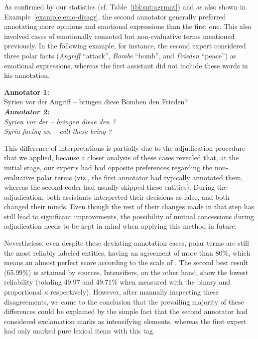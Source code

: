 As confirmed by our statistics (cf. Table~\ref{tbl:snt:agrmnt}) and as
also shown in Example~\ref{example:emo-disagr}, the second annotator
generally preferred annotating more opinions and emotional expressions
than the first one.  This also involved cases of emotionally connoted
but non-evaluative terms mentioned previously. In the following
example, for instance, the second expert considered three polar facts
(\emph{Angriff} ``attack'', \emph{Bombe} ``bomb'', and \emph{Frieden}
``peace'') as emotional expressions, whereas the first assistant did
not include these words in his annotation.

{ \renewcommand{\thesection}{\arabic{section}}
  \begin{example}\label{example:emo-disagr}
    \textbf{Annotator 1:}\\
    \upshape{}Syrien vor der Angriff -- bringen diese Bomben den Frieden?\\[0.8em]\itshape
    \textbf{Annotator 2:}\\
    \upshape{}Syrien vor der \emoexpression{\textcolor{red}{Angriff}}
    -- bringen diese \emoexpression{\textcolor{red}{Bomben}} den
    \emoexpression{\textcolor{red}{Frieden}}?\\[0.8em]

    \noindent\itshape{}Syria facing an
    \upshape{}\itshape{}
    -- will these
    \upshape{}\itshape{}
    bring
    \upshape{}\itshape{}?
  \end{example}
}

This difference of interpretations is partially due to the
adjudication procedure that we applied, because a closer analysis of
these cases revealed that, at the initial stage, our experts had had
opposite preferences regarding the non-evaluative polar terms (viz.,
the first annotator had typically annotated them, whereas the second
coder had usually skipped these entities).  During the adjudication,
both assistants interpreted their decisions as false, and both changed
their minds.  Even though the rest of their changes made in that step
has still lead to significant improvements, the possibility of mutual
concessions during adjudication needs to be kept in mind when applying
this method in future.

Nevertheless, even despite these deviating annotation cases, polar
terms are still the most reliably labeled entities, having an
agreement of more than $80\%$, which means an almost perfect score
according to the scale of \citet{Landis:77}.  The second best result
(65.99\%) is attained by sources.  Intensifiers, on the other hand,
show the lowest reliability (totaling 49.97 and 49.71\% when measured
with the binary and proportional $\kappa$ respectively).  However,
after manually inspecting these disagreements, we came to the
conclusion that the prevailing majority of these differences could be
explained by the simple fact that the second annotator had considered
exclamation marks as intensifying elements, whereas the first expert
had only marked pure lexical items with this tag.

